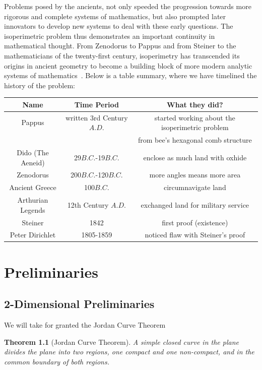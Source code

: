 \documentclass[a4paper]{book}
\newtheorem{theorem}{Theorem}%
\numberwithin{theorem}{section}%
\begin{document}
Problems posed by the ancients, not only speeded the progression towards more rigorous and complete systems of mathematics, but also prompted later innovators to develop new systems to deal with these early questions. The isoperimetric problem thus demonstrates an important continuity in mathematical thought. From Zenodorus to Pappus and from Steiner to the mathematicians of the twenty-first century, isoperimetry has transcended its origins in ancient geometry to become a building block of more modern analytic systems of mathematics~\citep{wiegert2010sagacity}. Below is a table summary, where we have timelined the history of the problem:
\begin{center}
    \begin{tabular}{||c c c||} 
        \hline
        Name & Time Period & What they did? \\ [0.5ex] 
        \hline
        Pappus & written 3rd Century $A.D.$ & started working about the isoperimetric problem \\ && from bee's hexagonal comb structure  \\ 
        \hline
        Dido (The Aeneid) & 29$B.C.$-19$B.C.$ & enclose as much land with oxhide \\
        \hline
        Zenodorus & 200$B.C.$-120$B.C.$ & more angles means more area \\
        \hline
        Ancient Greece & 100$B.C.$ & circumnavigate land \\
        \hline
        Arthurian Legends & 12th Century $A.D.$ & exchanged land for military service \\
        \hline
        Steiner & 1842 & first proof (existence) \\ 
        \hline
        Peter Dirichlet & 1805-1859 & noticed flaw with Steiner's proof \\ [1ex]
        \hline
    \end{tabular}
\end{center}

\chapter{Preliminaries}
\section{2-Dimensional Preliminaries}
We will take for granted the Jordan Curve Theorem
\begin{theorem}[Jordan Curve Theorem]
    A simple closed curve in the plane divides the plane into two regions, one compact and one non-compact, and in the common boundary of both regions.
\end{theorem} 
\end{document}
